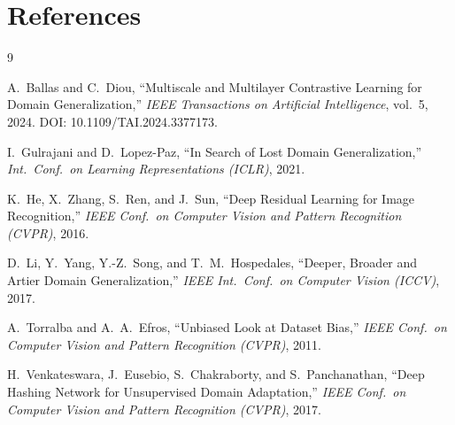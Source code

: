 \documentclass[11pt,a4paper]{article}
\begin{document}
\section{References}

\begin{thebibliography}{9}

A.\ Ballas and C.\ Diou,
``Multiscale and Multilayer Contrastive Learning for Domain Generalization,''
\textit{IEEE Transactions on Artificial Intelligence}, vol.\ 5, 2024.
DOI: 10.1109/TAI.2024.3377173.

I.\ Gulrajani and D.\ Lopez-Paz,
``In Search of Lost Domain Generalization,''
\textit{Int.\ Conf.\ on Learning Representations (ICLR)}, 2021.

K.\ He, X.\ Zhang, S.\ Ren, and J.\ Sun,
``Deep Residual Learning for Image Recognition,''
\textit{IEEE Conf.\ on Computer Vision and Pattern Recognition (CVPR)}, 2016.

D.\ Li, Y.\ Yang, Y.-Z.\ Song, and T.\ M.\ Hospedales,
``Deeper, Broader and Artier Domain Generalization,''
\textit{IEEE Int.\ Conf.\ on Computer Vision (ICCV)}, 2017.

A.\ Torralba and A.\ A.\ Efros,
``Unbiased Look at Dataset Bias,''
\textit{IEEE Conf.\ on Computer Vision and Pattern Recognition (CVPR)}, 2011.

H.\ Venkateswara, J.\ Eusebio, S.\ Chakraborty, and S.\ Panchanathan,
``Deep Hashing Network for Unsupervised Domain Adaptation,''
\textit{IEEE Conf.\ on Computer Vision and Pattern Recognition (CVPR)}, 2017.

\end{thebibliography}
\end{document}
